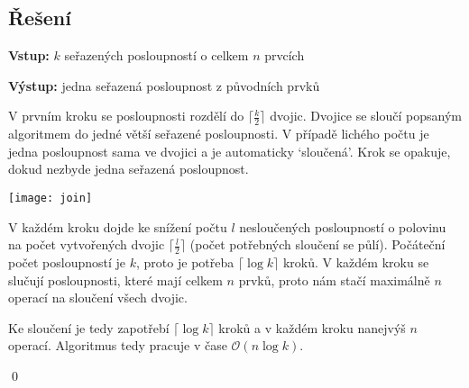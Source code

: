 \documentclass{article}
\begin{document}
\subsection{Řešení}

\textbf{Vstup:} $k$ seřazených posloupností o celkem $n$ prvcích

\textbf{Výstup:} jedna seřazená posloupnost z původních prvků

V prvním kroku se posloupnosti rozdělí do $\lceil \frac{k}{2} \rceil$ dvojic. Dvojice se sloučí popsaným algoritmem do jedné větší seřazené posloupnosti. V případě lichého počtu je jedna posloupnost sama ve dvojici a je automaticky `sloučená'. Krok se opakuje, dokud nezbyde jedna seřazená posloupnost.

\begin{center}
    \texttt{[image: join]}
\end{center}

V každém kroku dojde ke snížení počtu $l$ nesloučených posloupností o polovinu na počet vytvořených dvojic $\lceil \frac{l}{2} \rceil$ (počet potřebných sloučení se půlí). Počáteční počet posloupností je $k$, proto je potřeba $\lceil \log k \rceil$ kroků. V každém kroku se slučují posloupnosti, které mají celkem $n$ prvků, proto nám stačí maximálně $n$ operací na sloučení všech dvojic.

Ke sloučení je tedy zapotřebí $\lceil \log k \rceil$ kroků a v každém kroku nanejvýš $n$ operací. Algoritmus tedy pracuje v čase $\mathcal{O}(n \log k)$.

\qed
\end{document}
